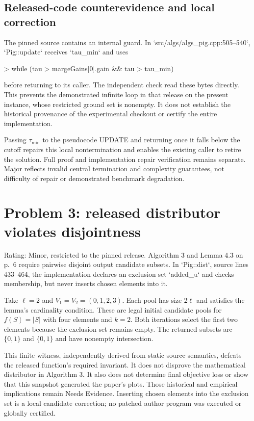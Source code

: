 \documentclass[10pt]{article}
\begin{document}
\subsection*{Released-code counterevidence and local correction}
The pinned source contains an internal guard. In `src/algs/algs\_pig.cpp:505–540`, `Pig::update` receives `tau\_min` and uses\par
> while (tau > margeGains[0].gain \&\& tau > tau\_min)\par
before returning to its caller. The independent check read these bytes directly. This prevents the demonstrated infinite loop in that release on the present instance, whose restricted ground set is nonempty. It does not establish the historical provenance of the experimental checkout or certify the entire implementation.\par
Passing \(\tau_{\min}\) to the pseudocode UPDATE and returning once it falls below the cutoff repairs this local nontermination and enables the existing caller to retire the solution. Full proof and implementation repair verification remains separate. Major reflects invalid central termination and complexity guarantees, not difficulty of repair or demonstrated benchmark degradation.\par
\section*{Problem 3: released distributor violates disjointness}
Rating: Minor, restricted to the pinned release. Algorithm 3 and Lemma 4.3 on p. 6 require pairwise disjoint output candidate subsets. In `Pig::dist`, source lines 433–464, the implementation declares an exclusion set `added\_u` and checks membership, but never inserts chosen elements into it.\par
Take \(\ell=2\) and \(V_1=V_2=(0,1,2,3)\). Each pool has size \(2\ell\) and satisfies the lemma’s cardinality condition. These are legal initial candidate pools for \(f(S)=|S|\) with four elements and \(k=2\). Both iterations select the first two elements because the exclusion set remains empty. The returned subsets are \(\{0,1\}\) and \(\{0,1\}\) and have nonempty intersection.\par
This finite witness, independently derived from static source semantics, defeats the released function’s required invariant. It does not disprove the mathematical distributor in Algorithm 3. It also does not determine final objective loss or show that this snapshot generated the paper’s plots. Those historical and empirical implications remain Needs Evidence. Inserting chosen elements into the exclusion set is a local candidate correction; no patched author program was executed or globally certified.\par
\end{document}
